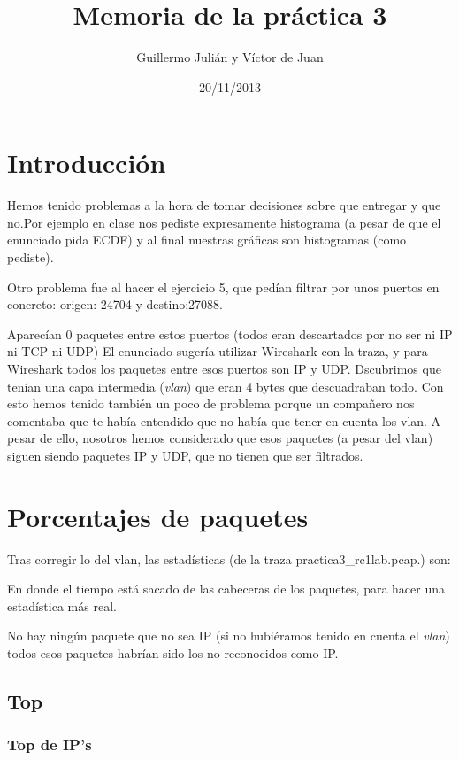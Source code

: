 \documentclass[nochap]{apuntes}
\title{Memoria de la práctica 3}
\author{Guillermo Julián y Víctor de Juan}
\date{20/11/2013}
\begin{document}
\pagestyle{plain}
\maketitle

\section{Introducción}

Hemos tenido problemas a la hora de tomar decisiones sobre que entregar y que no.Por ejemplo en clase nos pediste expresamente histograma (a pesar de que el enunciado pida ECDF) y al final nuestras gráficas son histogramas (como pediste).

Otro problema fue al hacer el ejercicio 5, que pedían filtrar por unos puertos en concreto: origen: 24704 y destino:27088.

Aparecían 0 paquetes entre estos puertos (todos eran descartados por no ser ni IP ni TCP ni UDP) El enunciado sugería utilizar Wireshark con la traza, y para Wireshark todos los paquetes entre esos puertos son IP y UDP. Dscubrimos que tenían una capa intermedia (\emph{vlan}) que eran 4 bytes que descuadraban todo. Con esto hemos tenido también un poco de problema porque un compañero nos comentaba que te había entendido que no había que tener en cuenta los vlan. A pesar de ello, nosotros hemos considerado que esos paquetes (a pesar del vlan) siguen siendo paquetes IP y UDP, que no tienen que ser filtrados.


\section{Porcentajes de paquetes}

Tras corregir lo del vlan, las estadísticas (de la traza practica3\_rc1lab.pcap.) son:


En donde el tiempo está sacado de las cabeceras de los paquetes, para hacer una estadística más real.

No hay ningún paquete que no sea IP (si no hubiéramos tenido en cuenta el \emph{vlan}) todos esos paquetes habrían sido los no reconocidos como IP.
\newpage
\subsection{Top}

\subsubsection{Top de IP's}
\end{document}
